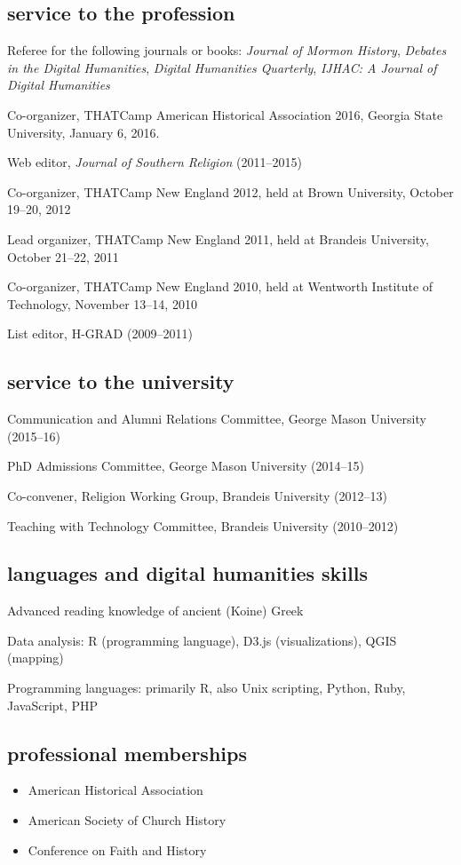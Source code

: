 \documentclass[11pt]{article}
\providecommand{\tightlist}{%
  \setlength{\itemsep}{0pt}\setlength{\parskip}{0pt}}
\begin{document}
\subsection{service to the profession}\label{service-profession}

Referee for the following journals or books: \emph{Journal of Mormon History}, 
\emph{Debates in the Digital Humanities}, \emph{Digital Humanities Quarterly}, 
\emph{IJHAC: A Journal of Digital Humanities}

Co-organizer, THATCamp American Historical Association 2016, Georgia State University, January 6, 2016.

Web editor, \emph{Journal of Southern Religion} (2011--2015)

Co-organizer, THATCamp New England 2012, held at Brown University,
October 19--20, 2012

Lead organizer, THATCamp New England 2011, held at Brandeis University,
October 21--22, 2011

Co-organizer, THATCamp New England 2010, held at Wentworth Institute of
Technology, November 13--14, 2010

List editor, H-GRAD (2009--2011)

\subsection{service to the university}\label{service-university}

Communication and Alumni Relations Committee, George Mason University 
(2015--16)

PhD Admissions Committee, George Mason University (2014--15)

Co-convener, Religion Working Group, Brandeis University (2012--13)

Teaching with Technology Committee, Brandeis University (2010--2012)


\subsection{languages and digital humanities
  skills}\label{languages-and-digital-humanities-skills}

Advanced reading knowledge of ancient (Koine) Greek

Data analysis: R (programming language), D3.js (visualizations), QGIS
(mapping)

Programming languages: primarily R, also Unix scripting, Python, Ruby, 
JavaScript, PHP

\subsection{professional memberships}\label{professional-memberships}

\begin{itemize}
    \tightlist
  \item
    American Historical Association
  \item
    American Society of Church History
  \item
    Conference on Faith and History
\end{itemize}
\end{document}
